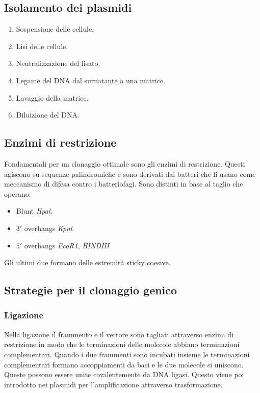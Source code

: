 	\subsection{Isolamento dei plasmidi}
	\begin{multicols}{2}
		\begin{enumerate}
			\item Sospensione delle cellule.
			\item Lisi delle cellule.
			\item Neutralizzazione del lisato.
			\item Legame del DNA dal surnatante a una matrice.
			\item Lavaggio della matrice.
			\item Diluizione del DNA.
		\end{enumerate}
	\end{multicols}

	\subsection{Enzimi di restrizione}
	Fondamentali per un clonaggio ottimale sono gli enzimi di restrizione.
	Questi agiscono su sequenze palindromiche e sono derivati dai batteri che li usano come meccanismo di difesa contro i batteriofagi.
	Sono distinti in base al taglio che operano:
	\begin{multicols}{2}
		\begin{itemize}
			\item Blunt \emph{Hpal}.
			\item $3'$ overhangs \emph{Kpnl}.
			\item $5'$ overhangs \emph{EcoR1}, \emph{HINDIII}
		\end{itemize}
	\end{multicols}
	Gli ultimi due formano delle estremit\`a sticky coesive.

	\subsection{Strategie per il clonaggio genico}

		\subsubsection{Ligazione}
		Nella ligazione il frammento e il vettore sono tagliati attraverso enzimi di restrizione in modo che le terminazioni delle molecole abbiano terminazioni complementari.
		Quando i due frammenti sono incubati insieme le terminazioni complementari formano accoppiamenti da basi e le due molecole si uniscono.
		Queste possono essere unite covalentemente da DNA ligasi.
		Questo viene poi introdotto nei plasmidi per l'amplificazione attraverso trasformazione.

